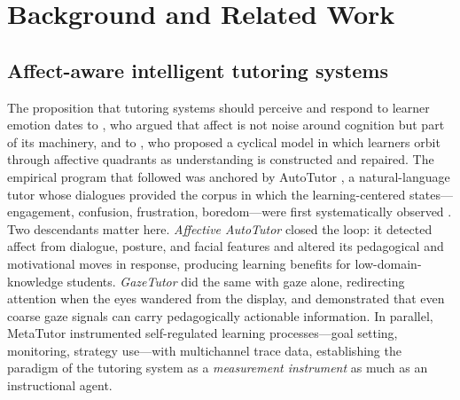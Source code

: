 \chapter{Background and Related Work}
\label{ch:background}


\section{Affect-aware intelligent tutoring systems}
\label{sec:bg-its}

The proposition that tutoring systems should perceive and respond to
learner emotion dates to \citet{picard1997}, who argued that affect is not
noise around cognition but part of its machinery, and to
\citet{kort2001}, who proposed a cyclical model in which learners orbit
through affective quadrants as understanding is constructed and repaired.
The empirical program that followed was anchored by AutoTutor
\citep{graesser2004autotutor}, a natural-language tutor whose dialogues
provided the corpus in which the learning-centered states---engagement,
confusion, frustration, boredom---were first systematically observed
\citep{craig2004}. Two descendants matter here. \emph{Affective AutoTutor}
\citep{dmello2012affective} closed the loop: it detected affect from
dialogue, posture, and facial features and altered its pedagogical and
motivational moves in response, producing learning benefits for
low-domain-knowledge students. \emph{GazeTutor} \citep{dmello2012gazetutor}
did the same with gaze alone, redirecting attention when the eyes wandered
from the display, and demonstrated that even coarse gaze signals can carry
pedagogically actionable information. In parallel, MetaTutor
\citep{azevedo2010metatutor} instrumented self-regulated learning
processes---goal setting, monitoring, strategy use---with multichannel
trace data, establishing the paradigm of the tutoring system as a
\emph{measurement instrument} as much as an instructional agent.

